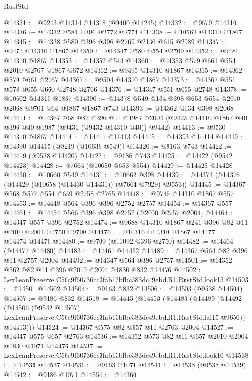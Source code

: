 \begin{lexlean}{RustStd}
\begin{coremodule}
@14331 := @9243 @14314 @14318 (@9400 @14245)
@14332 := @9679 @14310
@14336 := @14332 @581 @396 @2772 @2774
@14338 := @10562 @14310 @1867
@14345 := @14338 @580 @396 @396 @2769 @2136 @615 @2089
@14347 := @9472 @14310 @1867
@14350 := @14347 @580 @554 @2769
@14352 := @9481 @14310 @1867
@14353 := @14352 @544
@14360 := @14353 @579 @661 @554 @2010 @2767 @1867 @672
@14362 := @9495 @14310 @1867
@14365 := @14362 @579 @661 @2767
@14367 := @9504 @14310 @1867
@14373 := @14367 @551 @578 @655 @660 @2748 @2766
@14376 := @14347 @551 @655 @2748
@14378 := @10602 @14310 @1867
@14390 := @14378 @549 @134 @398 @653 @554 @2010 @2068 @9701 @64 @1867 @1867 @743
@14393 := @14362 @134 @398 @2068
@14411 := @14367
    @68
    @82
    @396
    @11
    @1987
    @2004
    (@9423 @14310 @1867 @40 @396 @40 @1987 (@9431 (@9432 @14310 @40)) @9442)
@14413 := @9530 @14310 @1867
@14414 := @14411 @14413
@14415 := @14393 @14414
@14419 := @14390 @14415 (@8219 (@10639 @549))
@14420 := @9163 @743
@14422 := @14419 (@9538 @14420)
@14423 := @9186 @743
@14425 := @14422 (@9542 @14423)
@14428 := @7664 (@10650 @653 @554)
@14429 := @14425 @14428
@14430 := @10660 @549
@14431 := @10662 @398
@14439 := @14373 (@14376 (@14429 (@10658 (@14430 @14431)) (@7664 @7929) @9553))
@14445 := @14367 @568 @577 @554 @659 @2758 @2765
@14448 := @9745 @14310 @1867 @557
@14453 := @14448 @564 @396 @396 @2752 @2757
@14454 := @14367 @557
@14461 := @14454 @566 @396 @398 @2752 (@2000 @2757 @2004)
@14464 := @14347 @557 @396 @2752
@14474 := @9688 @14310 @1867 @241 @396 @82 @11 @2010 @2004 @2750 @9700
@14476 := @10316 @14310 @1867
@14477 := @14474 @14476
@14480 := @9709 (@11092 @396 @2750)
@14482 := @14464 (@14477 @14480)
@14483 := @14461 @14482
@14489 := @14367 @564 @82 @396 @11 @2757 @2004
@14492 := @14347 @564 @396 @2757
@14501 := @14352 @562 @82 @11 @396 @2010 @2004 @1830 @832 @14476
@14502 := LexLeanPreserve.C56c9f60736cc3fab13bfbc383dc49ebd.R1.RustStd.look15
@14503 := @14501 @14502
@14504 := @9163 @832
@14506 := @14503 (@9538 @14504)
@14507 := @9186 @832
@14518 := @14445
    (@14453
      (@14483
        (@14489
          (@14492
            (@14506
              (@9542 @14507)
              LexLeanPreserve.C56c9f60736cc3fab13bfbc383dc49ebd.R1.RustStd.fal15
              @9656))
          @14413)))
@14524 := @14367 @575 @82 @657 @11 @2763 @2004
@14527 := @14347 @575 @657 @2763
@14536 := @14352 @573 @82 @11 @657 @2010 @2004 @1830 @1071 @14476
@14537 := LexLeanPreserve.C56c9f60736cc3fab13bfbc383dc49ebd.R1.RustStd.look16
@14538 := @14536 @14537
@14539 := @9163 @1071
@14541 := @14538 (@9538 @14539)
@14542 := @9186 @1071
@14554 := @14360

\end{coremodule}
\end{lexlean}
